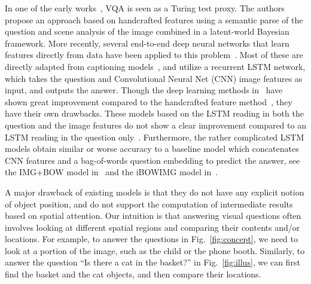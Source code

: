 In one of the early works~\cite{DBLP:journals/corr/MalinowskiF14}, VQA is seen as a Turing test proxy. The authors propose an approach based on handcrafted features using a semantic parse of the question and scene analysis of the image combined in a latent-world Bayesian framework. More recently, several end-to-end deep neural networks that learn features directly from data have been applied to this problem~\cite{malinowski2015ask,DBLP:journals/corr/RenKZ15}.
Most of these are directly adapted from captioning models~\cite{donahue2014long,vinyals2014show,karpathy2014deep},
and utilize a recurrent LSTM network, which takes the question and Convolutional Neural Net (CNN) image features as input, and outputs the answer. Though the deep learning methods in~\cite{malinowski2015ask,DBLP:journals/corr/RenKZ15} have shown great improvement compared to the handcrafted feature method~\cite{DBLP:journals/corr/MalinowskiF14}, they have their own drawbacks. These models based on the LSTM reading in both the question and the image features do not show a clear improvement compared to an LSTM reading in the question only~\cite{malinowski2015ask,DBLP:journals/corr/RenKZ15}.   
Furthermore, the rather complicated LSTM models obtain similar or worse accuracy to a baseline model which concatenates CNN features and a bag-of-words question embedding to predict the answer, see the IMG+BOW model in~\cite{DBLP:journals/corr/RenKZ15} and the iBOWIMG model in~\cite{zhou2015simple}.

A major drawback of existing models is that they do not have any explicit notion of object position, and do not support the computation of intermediate results based on spatial attention.
Our intuition is that answering visual questions often involves looking at different spatial regions and comparing their contents and/or locations. For example, to answer the questions in Fig.~\ref{fig:concept}, we need to look at a portion of the image, such as the child or the phone booth.
Similarly, to answer the question ``Is there a cat in the basket?'' in Fig.~\ref{fig:illus}, we can first find the basket and the cat objects, and then compare their locations.

